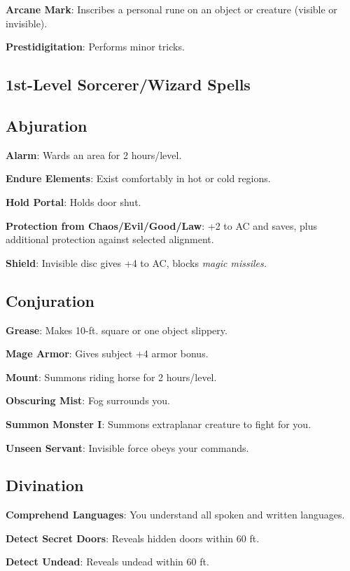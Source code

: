 \textbf{Arcane Mark}: Inscribes a personal rune on an object or creature (visible or invisible).

\textbf{Prestidigitation}: Performs minor tricks.

\subsection{1st-Level Sorcerer/Wizard Spells}


\subsection{Abjuration}


\textbf{Alarm}: Wards an area for 2 hours/level.

\textbf{Endure Elements}: Exist comfortably in hot or cold regions.

\textbf{Hold Portal}: Holds door shut.

\textbf{Protection from Chaos/Evil/Good/Law}: +2 to AC and saves, plus additional protection against selected alignment.

\textbf{Shield}: Invisible disc gives +4 to AC, blocks \textit{magic missiles.}

\subsection{Conjuration}


\textbf{Grease}: Makes 10-ft. square or one object slippery.

\textbf{Mage Armor}: Gives subject +4 armor bonus.

\textbf{Mount}: Summons riding horse for 2 hours/level.

\textbf{Obscuring Mist}: Fog surrounds you.

\textbf{Summon Monster I}: Summons extraplanar creature to fight for you.

\textbf{Unseen Servant}: Invisible force obeys your commands.

\subsection{Divination}


\textbf{Comprehend Languages}: You understand all spoken and written languages.

\textbf{Detect Secret Doors}: Reveals hidden doors within 60 ft.

\textbf{Detect Undead}: Reveals undead within 60 ft.

